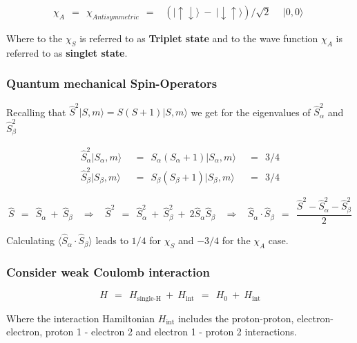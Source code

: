 \documentclass[10pt]{report}
\numberwithin{equation}{chapter}
\begin{document}
\begin{equation}
  \chi_A ~~ = ~~ \chi_{Antisymmetric} ~~ = ~~ 
  \begin{array}{ll}
    \left(| \uparrow \downarrow \rangle ~-~ | \downarrow \uparrow \rangle \right) / \sqrt{2} &~~ | 0,0 \rangle 
  \end{array}
\end{equation}

Where to the $\chi_S$ is referred to as \textbf{Triplet state} and to the wave function $\chi_A$ is referred to as \textbf{singlet state}.


\subsubsection{Quantum mechanical Spin-Operators}

Recalling that $\hat{S}^2 |S,m \rangle = S(S+1) | S,m \rangle$ we get for the eigenvalues of $\hat{S}^2_\alpha$ and $\hat{S}^2_\beta$

\begin{align}
  \hat{S}^2_\alpha |S_\alpha,m\rangle ~~ & = ~~ S_\alpha (S_\alpha+1) |S_\alpha,m\rangle ~~ & = ~~ 3/4\\
  \hat{S}^2_\beta  |S_\beta,m\rangle ~~ & = ~~ S_\beta  (S_\beta+1)  |S_\beta,m\rangle ~~ & = ~~ 3/4
\end{align}


\begin{equation}
  \hat{S} ~~=~~ \hat{S}_\alpha ~+~ \hat{S}_\beta ~~~~ \Rightarrow ~~~~ 
  \hat{S}^2 ~~=~~ \hat{S}^2_\alpha ~+~ \hat{S}^2_\beta ~+~ 2 \hat{S}_\alpha \hat{S}_\beta ~~~~ \Rightarrow ~~~~
  \hat{S}_\alpha \cdot \hat{S}_\beta ~~=~~ \frac{\hat{S}^2 - \hat{S}^2_\alpha - \hat{S}^2_\beta}{2}
\end{equation}


Calculating $\langle \hat{S}_\alpha \cdot \hat{S}_\beta \rangle$ leads to $1/4$ for $\chi_S$ and $-3/4$ for the $\chi_A$ case.


\subsubsection{Consider weak Coulomb interaction}


\begin{equation}
  H ~~=~~ H_\text{single-H} ~+~ H_\text{int} ~~=~~ H_0 ~+~ H_\text{int}
\end{equation}

Where the interaction Hamiltonian $H_\text{int}$ includes the proton-proton, electron-electron, proton 1 - electron 2 and electron 1 - proton 2 interactions.
\end{document}
